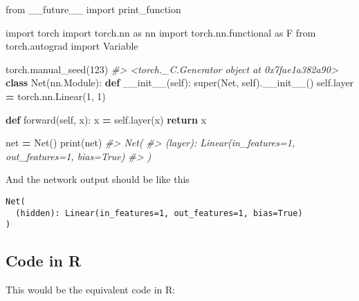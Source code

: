 \documentclass[]{book}
\newenvironment{Shaded}{\begin{snugshade}}{\end{snugshade}}
\newcommand{\BuiltInTok}[1]{#1}
\newcommand{\CommentTok}[1]{\textcolor[rgb]{0.56,0.35,0.01}{\textit{#1}}}
\newcommand{\ControlFlowTok}[1]{\textcolor[rgb]{0.13,0.29,0.53}{\textbf{#1}}}
\newcommand{\DecValTok}[1]{\textcolor[rgb]{0.00,0.00,0.81}{#1}}
\newcommand{\FunctionTok}[1]{\textcolor[rgb]{0.00,0.00,0.00}{#1}}
\newcommand{\ImportTok}[1]{#1}
\newcommand{\KeywordTok}[1]{\textcolor[rgb]{0.13,0.29,0.53}{\textbf{#1}}}
\newcommand{\NormalTok}[1]{#1}
\newcommand{\OperatorTok}[1]{\textcolor[rgb]{0.81,0.36,0.00}{\textbf{#1}}}
\newcommand{\VariableTok}[1]{\textcolor[rgb]{0.00,0.00,0.00}{#1}}
\begin{document}
\begin{Shaded}
\begin{Highlighting}[]
\ImportTok{from}\NormalTok{ __future__ }\ImportTok{import}\NormalTok{ print_function}

\ImportTok{import}\NormalTok{ torch}
\ImportTok{import}\NormalTok{ torch.nn }\ImportTok{as}\NormalTok{ nn}
\ImportTok{import}\NormalTok{ torch.nn.functional }\ImportTok{as}\NormalTok{ F}
\ImportTok{from}\NormalTok{ torch.autograd }\ImportTok{import}\NormalTok{ Variable}

\NormalTok{torch.manual_seed(}\DecValTok{123}\NormalTok{)}
\CommentTok{#> <torch._C.Generator object at 0x7fae1a382a90>}
\KeywordTok{class}\NormalTok{ Net(nn.Module):}
   \KeywordTok{def} \FunctionTok{__init__}\NormalTok{(}\VariableTok{self}\NormalTok{):}
       \BuiltInTok{super}\NormalTok{(Net, }\VariableTok{self}\NormalTok{).}\FunctionTok{__init__}\NormalTok{()}
       \VariableTok{self}\NormalTok{.layer }\OperatorTok{=}\NormalTok{ torch.nn.Linear(}\DecValTok{1}\NormalTok{, }\DecValTok{1}\NormalTok{)}

   \KeywordTok{def}\NormalTok{ forward(}\VariableTok{self}\NormalTok{, x):}
\NormalTok{       x }\OperatorTok{=} \VariableTok{self}\NormalTok{.layer(x)      }
       \ControlFlowTok{return}\NormalTok{ x}

\NormalTok{net }\OperatorTok{=}\NormalTok{ Net()}
\BuiltInTok{print}\NormalTok{(net)}
\CommentTok{#> Net(}
\CommentTok{#>   (layer): Linear(in_features=1, out_features=1, bias=True)}
\CommentTok{#> )}
\end{Highlighting}
\end{Shaded}

And the network output should be like this

\begin{verbatim}
Net(
  (hidden): Linear(in_features=1, out_features=1, bias=True)
)
\end{verbatim}

\hypertarget{code-in-r-1}{%
\subsection{Code in R}\label{code-in-r-1}}

This would be the equivalent code in R:
\end{document}
